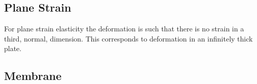 \subsection{Plane Strain}
\label{subsec:FiniteElasticityPlaneStrain}

For plane strain elasticity the deformation is such that there is no
strain in a third, normal, dimension. This corresponds to deformation
in an infinitely thick plate.

\subsection{Membrane}
\label{subsec:FiniteElasticityMembrane}

\subsection{\Onedal}
\label{subsec:FiniteElasticityOneDimension}


